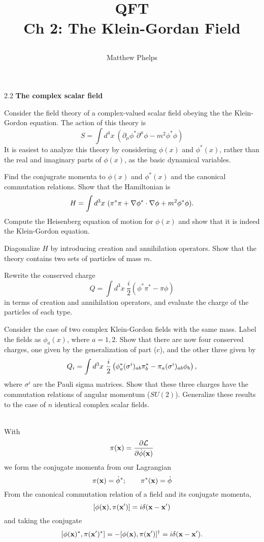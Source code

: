 \documentclass[10pt,letterpaper]{article}
\title{\begin{spacing}{1.3}QFT\\ Ch 2: The Klein-Gordan Field\end{spacing}}
\author{Matthew Phelps}
\date{}
\begin{document}
\maketitle

\benum
  	 \item[2.2]{\bf{The complex scalar field}}
	 
	Consider the field theory of a complex-valued scalar field obeying the the Klein-Gordon equation. The action of
	this theory is
	\[
		S = \int d^4x\ (\partial_\mu \phi^*\partial^\mu \phi-m^2\phi^*\phi)
	\]
	It is easiest to analyze this theory by considering $\phi(x)$ and $\phi^*(x)$, rather than the real and imaginary
	parts of $\phi(x)$, as the basic dynamical variables. 
	
	\benum
	\item
	Find the conjugrate momenta to $\phi(x)$ and $\phi^*(x)$ and the canonical commutation relations. Show that the
	Hamiltonian is 
	\[
		H = \int d^3x\ (\pi^*\pi +\del \phi^*\cdot \del \phi +m^2 \phi^*\phi).
	\]
	Compute the Heisenberg equation of motion for $\phi(x)$ and show that it is indeed the Klein-Gordon equation.
	
	\item
	Diagonalize $H$ by introducing creation and annihilation operators. Show that the theory contains two sets of 
	particles of mass $m$.
	
	\item
	Rewrite the conserved charge 
	\[
		Q = \int d^3x\ \frac{i}{2}(\phi^*\pi^*-\pi\phi)
	\]
	in terms of creation and annihilation operators, and evaluate the charge of the particles of each type. 
	\item
	Consider the case of two complex Klein-Gordon fields with the same mass. Label the fields as
	$\phi_a(x)$, where $a=1,2$. Show that there are now four conserved charges, one given by the
	generalization of part (c), and the other three given by
	\[
		Q_i = \int d^3x\ \frac{i}{2}\plr{\phi^*_a(\sigma^i)_{ab}\pi^*_b-\pi_a(\sigma^i)_{ab}\phi_b},
	\]
	where $\sigma^i$ are the Pauli sigma matrices. Show that these three charges have the commutation 
	relations of angular momentum ($SU(2)$). Generalize these results to the case of $n$ identical
	complex scalar fields. 
	\\ \\
	\eenum
	\pagebreak
	\benum
	\item 
	With
	\[
		\pi(\vect x) = \pdiff[\mathcal L]{\dot\phi(\vect x)}
	\]
	we form the conjugate momenta from our Lagrangian
	\[
		\pi(\vect x) = \dot\phi^*;\qquad \pi^*(\vect x) = \dot\phi
	\]
	From the canonical commutation relation of a field and its conjugate momenta,
	\[
		[\phi(\vect x),\pi(\vect x')] = i\delta(\vect x-\vect x')
	\]
	and taking the conjugate
	\[
		[\phi(\vect x)^*,\pi(\vect x')^*] = -[\phi(\vect x),\pi(\vect x')]^\dag = i\delta(\vect x-\vect x').
	\]
	
\end{document}
